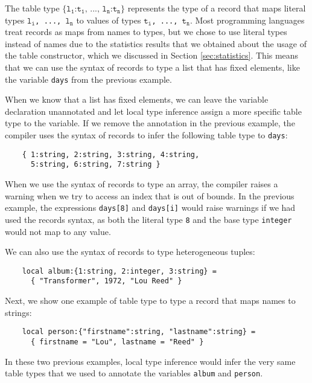 The table type
$\texttt{\{l}{_\texttt{1}}\texttt{:t}_{\texttt{1}}
\texttt{, ..., l}{_\texttt{n}}\texttt{:t}_{\texttt{n}}\texttt{\}}$
represents the type of a record that maps literal types
$\texttt{l}_{\texttt{i}}$\texttt{, ..., }$\texttt{l}_{\texttt{n}}$
to values of types $\texttt{t}_{\texttt{i}}$\texttt{, ..., }$\texttt{t}_{\texttt{n}}$.
Most programming languages treat records as maps from names
to types, but we chose to use literal types instead of
names due to the statistics results that we obtained about
the usage of the table constructor, which we discussed in
Section \ref{sec:statistics}.
This means that we can use the syntax of records to type a
list that has fixed elements, like the variable \texttt{days} from
the previous example.

When we know that a list has fixed elements, we can leave the
variable declaration unannotated and let local type inference assign
a more specific table type to the variable.
If we remove the annotation in the previous example, the compiler uses the
syntax of records to infer the following table type to \texttt{days}:
\begin{verbatim}
    { 1:string, 2:string, 3:string, 4:string,
      5:string, 6:string, 7:string }
\end{verbatim}

When we use the syntax of records to type an array, the compiler
raises a warning when we try to access an index that is out of bounds.
In the previous example, the expressions \texttt{days[8]} and \texttt{days[i]}
would raise warnings if we had used the records syntax,
as both the literal type \texttt{8} and the base type
\texttt{integer} would not map to any value.

We can also use the syntax of records to type heterogeneous tuples:
\begin{verbatim}
    local album:{1:string, 2:integer, 3:string} =
      { "Transformer", 1972, "Lou Reed" }
\end{verbatim}

Next, we show one example of table type to type a record that maps
names to strings:
\begin{verbatim}
    local person:{"firstname":string, "lastname":string} =
      { firstname = "Lou", lastname = "Reed" } 
\end{verbatim}

In these two previous examples, local type inference would infer the
very same table types that we used to annotate the variables
\texttt{album} and \texttt{person}.

